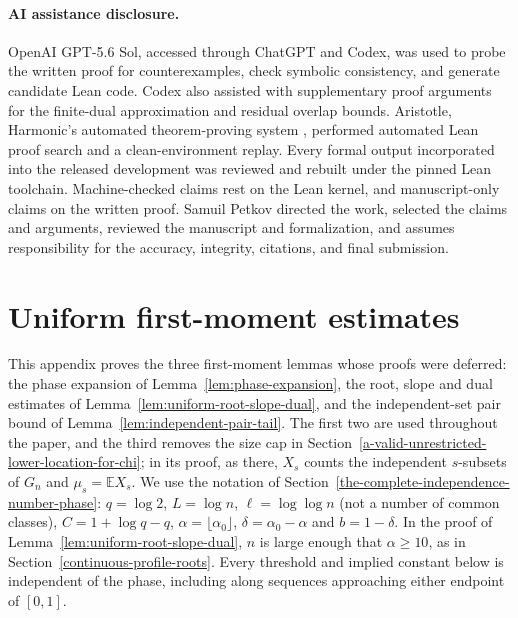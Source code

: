 \documentclass[a4paper,10pt,reqno]{amsart}
\numberwithin{equation}{section}
\theoremstyle{plain}
\theoremstyle{remark}
\begin{document}
\paragraph{AI assistance disclosure.}
OpenAI GPT-5.6 Sol, accessed through ChatGPT and Codex, was used to probe the
written proof for counterexamples, check symbolic consistency, and generate
candidate Lean code. Codex also assisted with supplementary proof arguments
for the finite-dual approximation and residual overlap bounds. Aristotle,
Harmonic's automated theorem-proving system \citep{achim-et-al-2025},
performed automated Lean proof search and a clean-environment replay. Every
formal output incorporated into the released development was reviewed and
rebuilt under the pinned Lean toolchain. Machine-checked claims rest on the
Lean kernel, and manuscript-only claims on the written proof. Samuil Petkov
directed the work, selected the claims and arguments, reviewed the manuscript
and formalization, and assumes responsibility for the accuracy, integrity,
citations, and final submission.

\renewcommand{\bibsection}{\section*{References}}
\begingroup
\footnotesize


\endgroup

\appendix

\section{Uniform first-moment estimates}
\label{app:first-moment-estimates}

This appendix proves the three first-moment lemmas whose proofs were
deferred: the phase expansion of Lemma~\ref{lem:phase-expansion}, the root,
slope and dual estimates of Lemma~\ref{lem:uniform-root-slope-dual}, and the
independent-set pair bound of Lemma~\ref{lem:independent-pair-tail}. The
first two are used throughout the paper, and the third removes the size cap
in Section~\ref{a-valid-unrestricted-lower-location-for-chi}; in its proof,
as there, $X_s$ counts the independent $s$-subsets of $G_n$ and
$\mu_s=\mathbb E X_s$. We use the notation of Section~\ref{the-complete-independence-number-phase}:
$q=\log 2$, $L=\log n$, $\ell=\log\log n$ (not a number of common classes),
$C=1+\log q-q$, $\alpha=\lfloor\alpha_0\rfloor$, $\delta=\alpha_0-\alpha$
and $b=1-\delta$. In the proof of Lemma~\ref{lem:uniform-root-slope-dual},
$n$ is large enough that $\alpha\ge10$, as in
Section~\ref{continuous-profile-roots}. Every threshold and implied constant
below is independent of the phase, including along sequences approaching
either endpoint of $[0,1]$.
\end{document}

